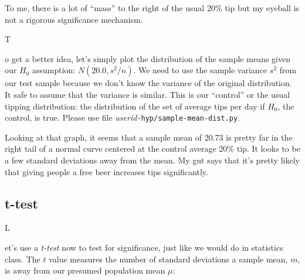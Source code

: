 \documentclass[titlepage]{tufte-book}
\newcounter{problem}
\newcommand{\step}[1]{{}
\vspace{4pt} \noindent {\bf \theproblem. }#1\addtocounter{problem}{1}}
\begin{document}
\begin{fullwidth}
To me, there is a lot of ``mass'' to the right of the usual 20\% tip but my eyeball is not a rigorous significance mechanism. 

\step To get a better idea, let's simply plot the distribution of the sample means given our $H_0$ assumption: $N(20.0, s^2/n)$.  We need to use the sample variance $s^2$ from our test sample because we don't know the variance of the original distribution. It safe to assume that the variance is similar. This is our ``control'' or the usual tipping distribution: the distribution of the set of average tips per day if $H_0$, the control, is true. Please use file {\em userid}{\tt -hyp/sample-mean-dist.py}.  


Looking at that graph, it seems that a sample mean of 20.73 is pretty far in the right tail of a normal curve centered at the control average 20\% tip. It looks to be a few standard deviations away from the mean. My gut says that it's pretty likely that giving people a free beer increases tips significantly.

\subsection{t-test}

\setcounter{problem}{1}

\step Let's use a {\em t-test} now to test for significance, just like we would do in statistics class. The $t$ value measures the number of standard deviations a sample mean, $m$, is away from our presumed population mean $\mu$: \\


\end{fullwidth}
\end{document}
